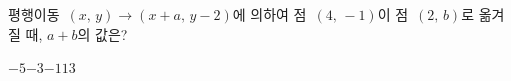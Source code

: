 평행이동~$(x,\,y)\longrightarrow(x+a,\,y-2)$에 의하여 점~$(4,\,-1)$이 점~$(2,\,b)$로 옮겨질 때, $a+b$의 값은?
\begin{choices32}{$-5$}{$-3$}{$-1$}{$1$}{$3$}\end{choices32}
